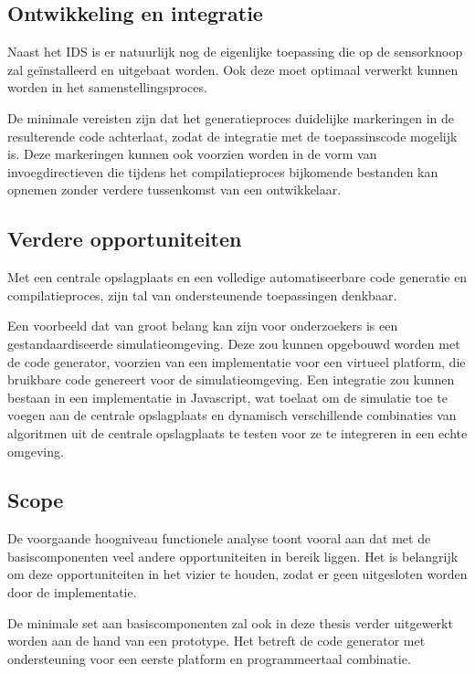 \subsection{Ontwikkeling en integratie}
\label{subsection:arch-integration}

Naast het IDS is er natuurlijk nog de eigenlijke toepassing die op de
sensorknoop zal ge\"installeerd en uitgebaat worden. Ook deze moet optimaal
verwerkt kunnen worden in het samenstellingsproces.

De minimale vereisten zijn dat het generatieproces duidelijke markeringen in de
resulterende code achterlaat, zodat de integratie met de toepassinscode
mogelijk is. Deze markeringen kunnen ook voorzien worden in de vorm van
invoegdirectieven die tijdens het compilatieproces bijkomende bestanden kan
opnemen zonder verdere tussenkomst van een ontwikkelaar.

\subsection{Verdere opportuniteiten}
\label{subsection:arch-opportunities}

Met een centrale opslagplaats en een volledige automatiseerbare code generatie
en compilatieproces, zijn tal van ondersteunende toepassingen denkbaar.

Een voorbeeld dat van groot belang kan zijn voor onderzoekers is een
gestandaardiseerde simulatieomgeving. Deze zou kunnen opgebouwd worden met de
code generator, voorzien van een implementatie voor een virtueel platform, die
bruikbare code genereert voor de simulatieomgeving. Een integratie zou kunnen
bestaan in een implementatie in Javascript, wat toelaat om de simulatie toe te
voegen aan de centrale opslagplaats en dynamisch verschillende combinaties van
algoritmen uit de centrale opslagplaats te testen voor ze te integreren in een
echte omgeving.

\subsection{Scope}
\label{subsection:arch-scope}

De voorgaande hoogniveau functionele analyse toont vooral aan dat met de
basiscomponenten veel andere opportuniteiten in bereik liggen. Het is
belangrijk om deze opportuniteiten in het vizier te houden, zodat er geen
uitgesloten worden door de implementatie.

De minimale set aan basiscomponenten zal ook in deze thesis verder uitgewerkt
worden aan de hand van een prototype. Het betreft de code generator met
ondersteuning voor een eerste platform en programmeertaal combinatie.

